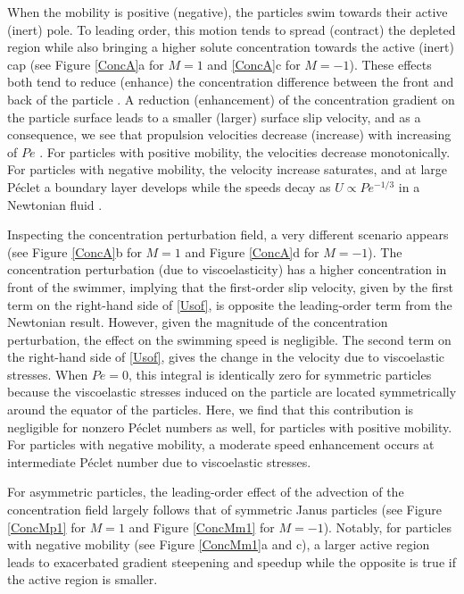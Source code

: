 \documentclass[aps,pre,reprint,twocolumn,notitlepage,superscriptaddress]{revtex4-1}
\begin{document}
When the mobility is positive (negative), the particles swim towards their active (inert) pole. To leading order, this motion tends to spread (contract) the depleted region while also bringing a higher solute concentration towards the active (inert) cap (see Figure \ref{ConcA}a for $M=1$ and \ref{ConcA}c for $M=-1$). These effects both tend to reduce (enhance) the concentration difference between the front and back of the particle \citep{michelin14}. A reduction (enhancement) of the concentration gradient on the particle surface leads to a smaller (larger) surface slip velocity, and as a consequence, we see that propulsion velocities decrease (increase) with increasing of $Pe$ \citep{michelin14}. For particles with positive mobility, the velocities decrease monotonically. For particles with negative mobility, the velocity increase saturates, and at large P\'eclet a boundary layer develops while the speeds decay as $U \propto Pe^{-1/3}$ in a Newtonian fluid \citep{michelin14, yariv15}.

Inspecting the concentration perturbation field, a very different scenario appears (see Figure \ref{ConcA}b for $M=1$ and Figure \ref{ConcA}d for $M=-1$). The concentration perturbation (due to viscoelasticity) has a higher concentration in front of the swimmer, implying that the first-order slip velocity, given by the first term on the right-hand side of \eqref{Usof}, is opposite the leading-order term from the Newtonian result. However, given the magnitude of the concentration perturbation, the effect on the swimming speed is negligible. The second term on the right-hand side of \eqref{Usof}, gives the change in the velocity due to viscoelastic stresses. When $Pe=0$, this integral is identically zero for symmetric particles because the viscoelastic stresses induced on the particle are located symmetrically around the equator of the particles. Here, we find that this contribution is negligible for nonzero P\'eclet numbers as well, for particles with positive mobility. For particles with negative mobility, a moderate speed enhancement occurs at intermediate P\'eclet number due to viscoelastic stresses.

For asymmetric particles, the leading-order effect of the advection of the concentration field largely follows that of symmetric Janus particles (see Figure \ref{ConcMp1} for $M=1$ and Figure \ref{ConcMm1} for $M=-1$). Notably, for particles with negative mobility (see Figure \ref{ConcMm1}a and c), a larger active region leads to exacerbated gradient steepening and speedup while the opposite is true if the active region is smaller.
\end{document}
